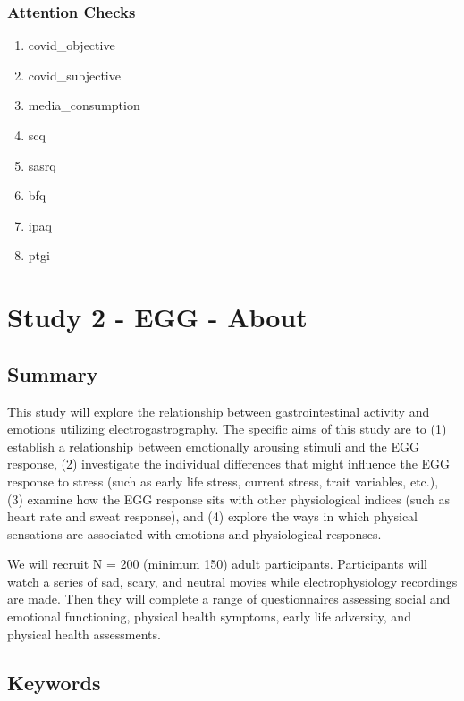 \documentclass[]{book}
\providecommand{\tightlist}{%
  \setlength{\itemsep}{0pt}\setlength{\parskip}{0pt}}
\begin{document}
\hypertarget{attention-checks}{%
\subsection{Attention Checks}\label{attention-checks}}

\begin{enumerate}
\def\labelenumi{\arabic{enumi}.}
\tightlist
\item
  covid\_objective
\item
  covid\_subjective
\item
  media\_consumption
\item
  scq
\item
  sasrq
\item
  bfq
\item
  ipaq
\item
  ptgi
\end{enumerate}

\hypertarget{study-2---egg---about}{%
\chapter{Study 2 - EGG - About}\label{study-2---egg---about}}

\hypertarget{summary-1}{%
\section{Summary}\label{summary-1}}

This study will explore the relationship between gastrointestinal activity and emotions utilizing electrogastrography. The specific aims of this study are to (1) establish a relationship between emotionally arousing stimuli and the EGG response, (2) investigate the individual differences that might influence the EGG response to stress (such as early life stress, current stress, trait variables, etc.), (3) examine how the EGG response sits with other physiological indices (such as heart rate and sweat response), and (4) explore the ways in which physical sensations are associated with emotions and physiological responses.

We will recruit N = 200 (minimum 150) adult participants. Participants will watch a series of sad, scary, and neutral movies while electrophysiology recordings are made. Then they will complete a range of questionnaires assessing social and emotional functioning, physical health symptoms, early life adversity, and physical health assessments.

\hypertarget{keywords-1}{%
\section{Keywords}\label{keywords-1}}
\end{document}
